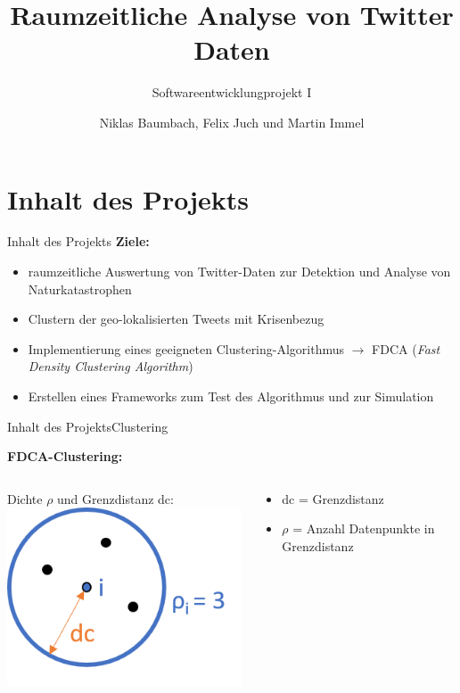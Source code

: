 \documentclass[12pt, xcolor={usenames,dvipsnames,svgnames,x11names,table}]{beamer}
\title{Raumzeitliche Analyse von Twitter Daten}
\subtitle{Softwareentwicklungprojekt I}
\author{Niklas Baumbach, Felix Juch und Martin Immel}
\date{}
\begin{document}
	\begin{frame}
	 	\titlepage
	\end{frame}	
	
	
	\section{Inhalt des Projekts}
	\begin{frame}{Inhalt des Projekts}{}
		\textbf{Ziele:}\\
		\begin{itemize}
			\item raumzeitliche Auswertung von Twitter-Daten zur Detektion und Analyse von Naturkatastrophen
			\item Clustern der geo-lokalisierten Tweets mit Krisenbezug 
			\item Implementierung eines geeigneten Clustering-Algorithmus $\rightarrow$ FDCA (\textit{Fast Density Clustering Algorithm})
			\item Erstellen eines Frameworks zum Test des Algorithmus und zur Simulation
		\end{itemize}
	\end{frame}
	
	
	\begin{frame}{Inhalt des Projekts}{Clustering}
	
		\textbf{FDCA-Clustering:}
		\\\bigskip
		\begin{columns}[c, onlytextwidth]
			\begin{column}{.45\textwidth}
				Dichte $\rho$ und Grenzdistanz dc:\\
				\bigskip
				\includegraphics[scale=.9]{dc_dichte}
			\end{column}
			
			\begin{column}{.55\textwidth}
				\begin{itemize}
					\item dc = Grenzdistanz
					\item $\rho$ = Anzahl Datenpunkte in Grenzdistanz
				\end{itemize}
			\end{column}
		\end{columns}
		
	\end{frame}
	
\end{document}
